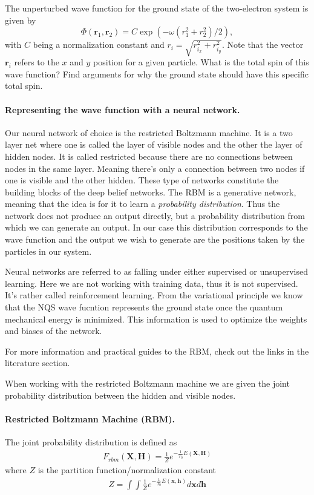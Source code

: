 \documentclass[%
oneside,                 %
final,                   %
10pt]{article}
\begin{document}
The unperturbed wave function for the ground state of the two-electron system is given by
\begin{equation*}
\Phi(\bm{r}_1,\bm{r}_2) = C\exp{\left(-\omega(r_1^2+r_2^2)/2\right)},
\end{equation*}
with $C$ being a normalization constant and $r_i = \sqrt{r_{i_x}^2+r_{i_y}^2}$. Note that the vector $\bm{r}_i$ 
refers to the $x$ and $y$ position for a given particle.
What is the total spin of this wave function? Find arguments for why the ground state should have
this specific total spin. 


\paragraph{Representing the wave function with a neural network.}
Our neural network of choice is the restricted Boltzmann machine. It
is a two layer net where one is called the layer of visible nodes and
the other the layer of hidden nodes. It is called restricted because
there are no connections between nodes in the same layer. Meaning
there's only a connection between two nodes if one is visible and the
other hidden. These type of networks constitute the building blocks of
the deep belief networks. The RBM is a
generative network, meaning that the idea is for it to learn a
\textit{probability distribution}. Thus the network does not produce
an output directly, but a probability distribution from which we can
generate an output. In our case this distribution corresponds to the
wave function and the output we wish to generate are the positions
taken by the particles in our system.

Neural networks are referred to as falling
under either supervised or unsupervised learning. Here we are not
working with training data, thus it is not supervised. It's rather
called reinforcement learning. From the variational principle we know
that the NQS wave fucntion represents the ground state once the
quantum mechanical energy is minimized. This information is used to
optimize the weights and biases of the network.

For more information and practical guides to the RBM, check out the links in the literature section.

When working with the restricted Boltzmann machine we are given the joint probability distribution between the hidden and visible nodes.

\paragraph{Restricted Boltzmann Machine (RBM).}
The joint probability distribution is defined as 
\begin{align}
	F_{rbm}(\mathbf{X},\mathbf{H}) = \frac{1}{Z} e^{-\frac{1}{T_0}E(\mathbf{X},\mathbf{H})}
\end{align}
where $Z$ is the partition function/normalization constant
\begin{align}
	Z = \int \int \frac{1}{Z} e^{-\frac{1}{T_0}E(\mathbf{x},\mathbf{h})} d\mathbf{x} d\mathbf{h}
\end{align}
\end{document}

